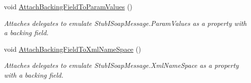 \begin{DoxyCompactItemize}
void \hyperlink{class_system_1_1_runtime_1_1_serialization_1_1_formatters_1_1_fakes_1_1_stub_i_soap_message_a2a446bd2e41e63b0b12cb07756859e18}{Attach\-Backing\-Field\-To\-Param\-Values} ()
\begin{DoxyCompactList}\small\item\em Attaches delegates to emulate Stub\-I\-Soap\-Message.\-Param\-Values as a property with a backing field.\end{DoxyCompactList}\item 
void \hyperlink{class_system_1_1_runtime_1_1_serialization_1_1_formatters_1_1_fakes_1_1_stub_i_soap_message_acf0942c2abfcd8c7cfdb33958e7e64e4}{Attach\-Backing\-Field\-To\-Xml\-Name\-Space} ()
\begin{DoxyCompactList}\small\item\em Attaches delegates to emulate Stub\-I\-Soap\-Message.\-Xml\-Name\-Space as a property with a backing field.\end{DoxyCompactList}\end{DoxyCompactItemize}
